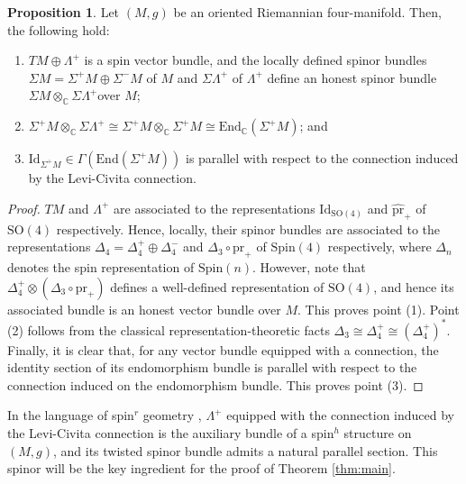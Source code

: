 \documentclass[oneside,12pt]{amsart}
\theoremstyle{definition}
\newtheorem{proposition}[lemma]{Proposition}
\numberwithin{equation}{section}
\begin{document}
\begin{proposition}\label{prop:spin}
    Let $(M,g)$ be an oriented Riemannian four-manifold. Then, the following hold: 
    \begin{enumerate}
        \item $TM \oplus \Lambda^+$ is a spin vector bundle, and the locally defined spinor bundles $\Sigma M = \Sigma^+ M \oplus \Sigma^- M$ of $M$ and $\Sigma \Lambda^+$ of $\Lambda^+$ define an honest spinor bundle $\Sigma M \otimes_{\mathbb{C}} \Sigma \Lambda^+$over $M$; 
        \item $\Sigma^+M \otimes_{\mathbb{C}} \Sigma \Lambda^+ \cong \Sigma^+M \otimes_{\mathbb{C}} \Sigma^+M \cong \mathrm{End}_{\mathbb{C}}(\Sigma^+M)$; and 
        \item $\mathrm{Id}_{\Sigma^+M} \in \Gamma(\mathrm{End}(\Sigma^+M))$ is parallel with respect to the connection induced by the Levi-Civita connection. 
    \end{enumerate}
\end{proposition}

\begin{proof}
    $TM$ and $\Lambda^+$ are associated to the representations $\mathrm{Id}_{\mathrm{SO}(4)}$ and $\widehat{\mathrm{pr}}_+$ of $\mathrm{SO}(4)$ respectively. Hence, locally, their spinor bundles are associated to the representations $\Delta_4 = \Delta^+_4 \oplus \Delta^-_4$ and $\Delta_3 \circ \mathrm{pr}_+$ of $\mathrm{Spin}(4)$ respectively, where $\Delta_n$ denotes the spin representation of $\mathrm{Spin}(n)$. However, note that $\Delta^+_4 \otimes (\Delta_3 \circ \mathrm{pr}_+)$ defines a well-defined representation of $\mathrm{SO}(4)$, and hence its associated bundle is an honest vector bundle over $M$. This proves point (1). Point (2) follows from the classical representation-theoretic facts $\Delta_3 \cong \Delta^+_4 \cong(\Delta^+_4)^*$. Finally, it is clear that, for any vector bundle equipped with a connection, the identity section of its endomorphism bundle is parallel with respect to the connection induced on the endomorphism bundle. This proves point (3). 
\end{proof}

In the language of spin$^r$ geometry \cite{EH16}, $\Lambda^+$ equipped with the connection induced by the Levi-Civita connection is the auxiliary bundle of a spin$^h$ structure on $(M,g)$, and its twisted spinor bundle admits a natural parallel section. This spinor will be the key ingredient for the proof of Theorem \ref{thm:main}.  
\end{document}
